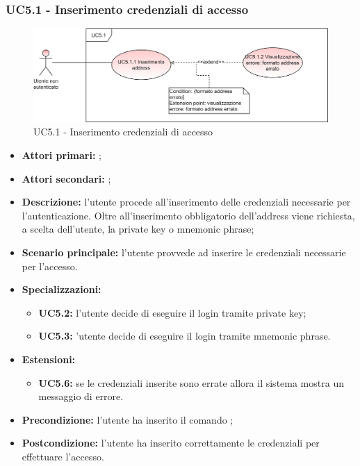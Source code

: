 \subsubsection{UC5.1 - Inserimento credenziali di accesso }
\begin{figure}[h]
	\centering
	\includegraphics[scale=\ucs]{./res/img/UC5-1.png}
	\caption {UC5.1 - Inserimento credenziali di accesso }
\end{figure}
\begin{itemize}
	\item \textbf{Attori primari:} \una{};
	\item \textbf{Attori secondari:} \re{};
	\item \textbf{Descrizione:} l’utente procede all’inserimento delle credenziali necessarie per l'autenticazione. Oltre all’inserimento obbligatorio dell’address viene richiesta, a scelta dell’utente, la private key o mnemonic phrase; 
	\item \textbf{Scenario principale:} l'utente provvede ad inserire le credenziali necessarie per l’accesso.  
	\item \textbf{Specializzazioni:} 
	\begin{itemize}
		\item \textbf{UC5.2:} l’utente decide di eseguire il login tramite private key;
		\item \textbf{UC5.3:} ’utente decide di eseguire il login tramite mnemonic phrase.
	\end{itemize}
	\item \textbf{Estensioni:} 
	\begin{itemize}
		\item \textbf{UC5.6:} se le credenziali inserite sono errate allora il sistema mostra un messaggio di errore.  
	\end{itemize}
	\item \textbf{Precondizione:}  l’utente ha inserito il comando \login{};   
	\item \textbf{Postcondizione:} l'utente ha inserito correttamente le credenziali per effettuare l’accesso. 
\end{itemize}